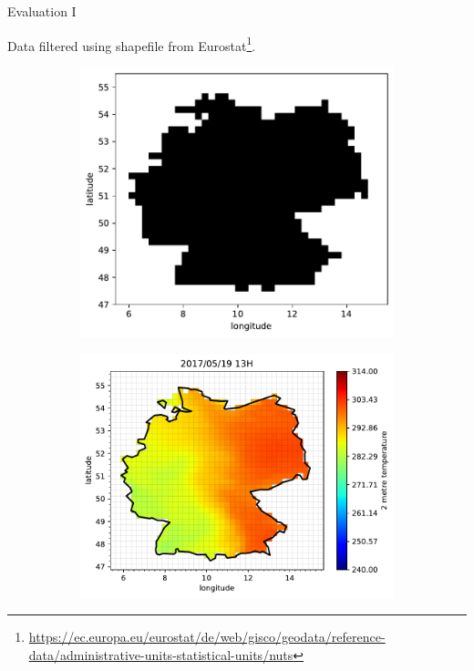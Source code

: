 \documentclass[t,xcolor={table},fleqn]{beamer}
\begin{document}
\begin{frame}{Evaluation I}

Data filtered using shapefile from Eurostat\footnote{\url{https://ec.europa.eu/eurostat/de/web/gisco/geodata/reference-data/administrative-units-statistical-units/nuts}}.

\begin{figure}[h!]%
	\centering
	\begin{subfigure}{.5\textwidth}
		\centering
		\includegraphics[width=.85\textwidth]{../doc/plots/isinDE}%
		\label{fig:isinDE}%
	\end{subfigure}%
	\begin{subfigure}{.5\textwidth}
		\centering
		\includegraphics[width=.95\textwidth]{../doc/plots/t2m/maxvar/0_map_isin}%
		\label{fig:t2m_maxvar_0_map_isin}%
	\end{subfigure}
	\label{fig:isin_compare}
\end{figure}

\end{frame}
\end{document}
